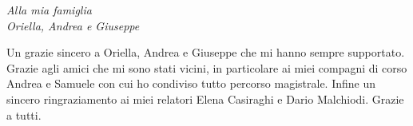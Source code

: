 \documentclass[12pt,italian]{report}
\begin{document}
	
	\frontespizio
	\beforepreface
	
	
	{\raggedleft \large \sl Alla mia famiglia\\
		Oriella, Andrea e Giuseppe\\
		
	}
	
	
	
	
	
	
	
	Un grazie sincero a Oriella, Andrea e Giuseppe che mi hanno sempre supportato. Grazie agli amici che mi sono stati vicini, in particolare ai miei compagni di corso Andrea e Samuele con cui ho condiviso tutto percorso magistrale. Infine un sincero ringraziamento ai miei relatori Elena Casiraghi e Dario Malchiodi.
	Grazie a tutti.
	
	
	\afterpreface
	
	
	
\end{document}
